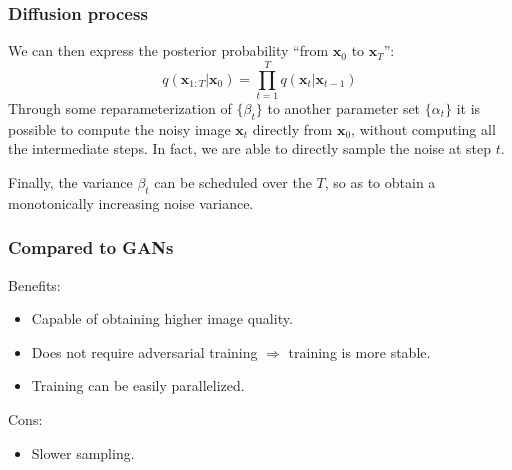 \begin{frame}
    \frametitle{Diffusion process}
    We can then express the posterior probability ``from $\textbf{x}_0$ to $\textbf{x}_T$'':
    $$q(\textbf{x}_{1:T}|\textbf{x}_0)=\prod_{t=1}^T q(\textbf{x}_t | \textbf{x}_{t-1})$$
    Through some reparameterization of $\{\beta_t\}$ to another parameter set $\{\alpha_t\}$ it is possible to compute the noisy image $\textbf{x}_t$ directly from $\textbf{x}_{0}$, without computing all the intermediate steps. In fact, we are able to directly sample the noise at step $t$.

    Finally, the variance $\beta_t$ can be scheduled over the $T$, so as to obtain a monotonically increasing noise variance.
\end{frame}

\begin{frame}
    \frametitle{Compared to GANs}
    Benefits:
    \begin{itemize}
        \item Capable of obtaining higher image quality.
        \item Does not require adversarial training $\Rightarrow$ training is more stable.
        \item Training can be easily parallelized.
    \end{itemize}
    Cons:
    \begin{itemize}
        \item Slower sampling.
    \end{itemize}
\end{frame}